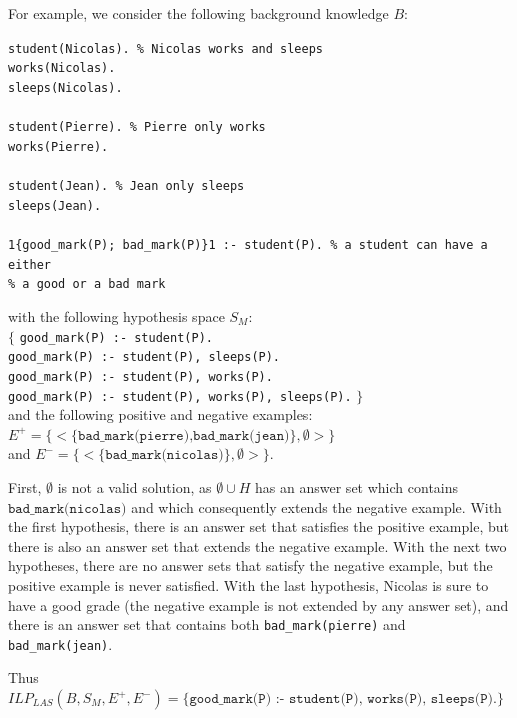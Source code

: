 \begin{example}

For example, we consider the following background knowledge $B$:

\texttt{student(Nicolas). \% Nicolas works and sleeps\\
works(Nicolas).\\
sleeps(Nicolas).\\
\\
student(Pierre). \% Pierre only works\\
works(Pierre). \\
\\
student(Jean). \% Jean only sleeps\\
sleeps(Jean). \\
\\
1\{good\_mark(P); bad\_mark(P)\}1 :- student(P). \% a student can have a either \\
											\% a good or a bad mark}
											
with the following hypothesis space $S_M$: \\
$\{$ \texttt{good\_mark(P) :- student(P).\\
good\_mark(P) :- student(P), sleeps(P).\\
good\_mark(P) :- student(P), works(P).\\
good\_mark(P) :- student(P), works(P), sleeps(P).} $\}$\\
and the following positive and negative examples: \\$E^+=\{<\{\texttt{bad\_mark(pierre),bad\_mark(jean)}\},\emptyset>\}$ \\and $E^-=\{<\{\texttt{bad\_mark(nicolas)}\},\emptyset>\}$.

\bigskip

First, $\emptyset$ is not a valid solution, as $\emptyset\cup H$ has an answer set which contains $\texttt{bad\_mark(nicolas)}$ and which consequently extends the negative example. With the first hypothesis, there is an answer set that satisfies the positive example, but there is also an answer set that extends the negative example. With the next two hypotheses, there are no answer sets that satisfy the negative example, but the positive example is never satisfied. With the last hypothesis, Nicolas is sure to have a good grade (the negative example is not extended by any answer set), and there is an answer set that contains both \texttt{bad\_mark(pierre)} and \texttt{bad\_mark(jean)}.

\bigskip

Thus $ILP_{LAS}(B,S_M,E^+,E^-)=\{\texttt{good\_mark(P) :- student(P), works(P), sleeps(P).}\}$

\end{example}

